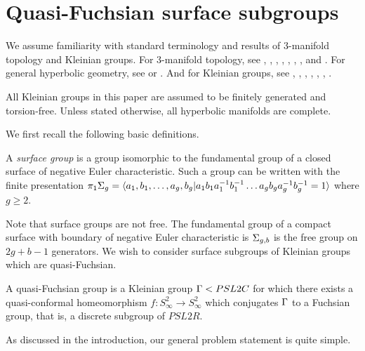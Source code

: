\section{Quasi-Fuchsian surface subgroups}

We assume familiarity with standard terminology and results of 3-manifold
topology and Kleinian groups.  For 3-manifold topology, see \cite{He},
\cite{Ja}, \cite{Sch}, \cite{Thurstonbook}, \cite{Thurstonnotes},
\cite{Lackenbynotes}, \cite{Hatchernotes}, and \cite{Calegarinotes2}.  For
general hyperbolic geometry, see \cite{Ratcliffe} or \cite{BenedettiPetronio}.
And for Kleinian groups, see \cite{Maskit}, \cite{Marden},
\cite{MatsuzakiTaniguchi}, \cite{Thurstonnotes}, \cite{Calegarinotes},
\cite{Kapovich}, \cite{Hubbard}.

All Kleinian groups in this paper are assumed to be finitely generated and
torsion-free. Unless stated otherwise, all hyperbolic manifolds are complete.

We first recall the following basic definitions.

\begin{defn}

A \emph{surface group} is a group isomorphic to the fundamental group of
a closed surface of negative Euler characteristic. Such a group can be written
with the finite presentation
%
$\pi_1 \Sigma_g = \langle a_1,b_1,\dots,a_g,b_g | a_1b_1a_1^{-1}b_1^{-1} \dots
a_gb_ga_g^{-1}b_g^{-1} = 1\rangle$
%
where $g \geq 2$.

\end{defn}

Note that surface groups are not free. The fundamental group of a compact
surface with boundary of negative Euler characteristic is $\Sigma_{g,b}$ is the
free group on $2g + b - 1$ generators. We wish to consider surface subgroups of
Kleinian groups which are quasi-Fuchsian.

\begin{defn}

A {quasi-Fuchsian group} is a Kleinian group $\Gamma < PSL2C$ for which there
exists a quasi-conformal homeomorphism $f \colon S^2_\infty \to S^2_\infty$
which conjugates $\Gamma$ to a Fuchsian group, that is, a discrete subgroup of
$PSL2R$.

\end{defn}

As discussed in the introduction, our general problem statement is quite
simple.

